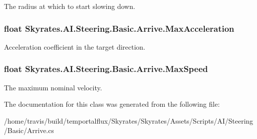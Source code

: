 The radius at which to start slowing down. 

\hypertarget{class_skyrates_1_1_a_i_1_1_steering_1_1_basic_1_1_arrive_ac17fbcbc0b427a93ed44b0c383a9e811}{
\subsubsection[{Max\-Acceleration}]{\setlength{\rightskip}{0pt plus 5cm}float Skyrates.\-A\-I.\-Steering.\-Basic.\-Arrive.\-Max\-Acceleration}}\label{class_skyrates_1_1_a_i_1_1_steering_1_1_basic_1_1_arrive_ac17fbcbc0b427a93ed44b0c383a9e811}


Acceleration coefficient in the target direction. 

\hypertarget{class_skyrates_1_1_a_i_1_1_steering_1_1_basic_1_1_arrive_a2939d630dada02a8d58d090c2e0b0d54}{
\subsubsection[{Max\-Speed}]{\setlength{\rightskip}{0pt plus 5cm}float Skyrates.\-A\-I.\-Steering.\-Basic.\-Arrive.\-Max\-Speed}}\label{class_skyrates_1_1_a_i_1_1_steering_1_1_basic_1_1_arrive_a2939d630dada02a8d58d090c2e0b0d54}


The maximum nominal velocity. 



The documentation for this class was generated from the following file\-:\begin{DoxyCompactItemize}
\item 
/home/travis/build/temportalflux/\-Skyrates/\-Skyrates/\-Assets/\-Scripts/\-A\-I/\-Steering/\-Basic/Arrive.\-cs\end{DoxyCompactItemize}
